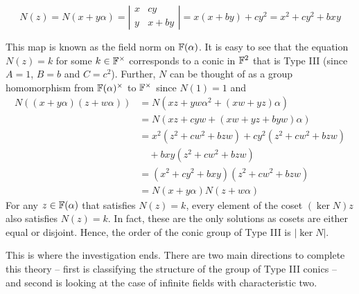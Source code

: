\[
    N(z) = N(x + y\alpha)
    = \left|\begin{matrix}x & cy \\ y & x + by\end{matrix}\right|
    = x(x + by) + c y^2
    = x^2 + cy^2 + bxy
\]

This map is known as the field norm on $\mathbb{F}(\alpha)$. It is easy to see that the
equation $N(z)=k$ for some $k\in\mathbb{F}^\times$ corresponds to a conic in $\mathbb{F}^2$ that
is Type III (since $A=1$, $B=b$ and $C=c^2$). Further, $N$ can be thought of as a
group homomorphism from $\mathbb{F}(\alpha)^\times$ to $\mathbb{F}^\times$ since $N(1)=1$ and
\begin{align*}
    N((x+y\alpha)(z+w\alpha)) &= N(xz+yw\alpha^2+(xw+yz)\alpha) \\
                              &= N(xz+cyw+(xw+yz+byw)\alpha) \\
                              &= x^2 (z^2 + cw^2 + bzw) + cy^2 (z^2 + cw^2 + bzw) \\
                              &\quad+ bxy (z^2 + cw^2 + bzw) \\
                              &= (x^2 + cy^2 + bxy) (z^2 + cw^2 + b zw) \\
                              &= N(x+y\alpha)N(z+w\alpha)
\end{align*}
For any $z\in\mathbb{F}(\alpha)$ that satisfies $N(z)=k$, every element of the coset
$(\ker N)z$ also satisfies $N(z)=k$. In fact, these are the only solutions as
cosets are either equal or disjoint. Hence, the order of the conic group of Type
III is $|\ker N|$.

\vspace{1ex}

This is where the investigation ends. There are two main directions to complete
this theory -- first is classifying the structure of the group of Type III conics
-- and second is looking at the case of infinite fields with characteristic two.
